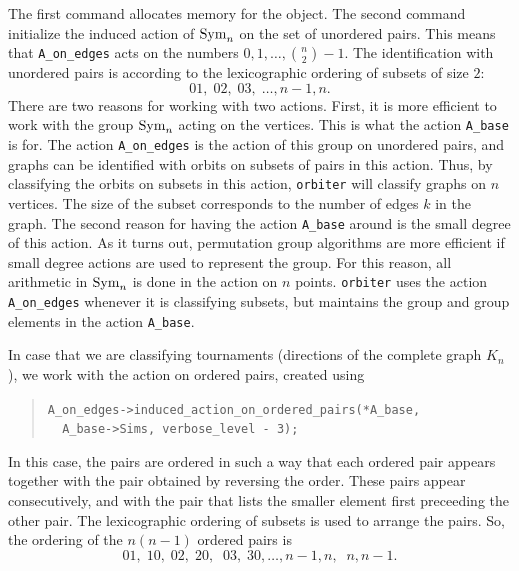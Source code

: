 The first command allocates memory for the object.
The second command initialize the induced action of ${\rm Sym}_n$ 
on the set of unordered pairs. This means that \verb'A_on_edges' acts on 
the numbers $0,1,\ldots,{n\choose 2}-1.$
The identification with unordered pairs is according to the lexicographic ordering of 
subsets of size $2$:
$$
01, \; 02, \;03, \; \ldots, n-1,n. 
$$
There are two reasons for working with two actions. 
First, it is more efficient to work with the group 
${\rm Sym}_n$ acting on the vertices. This is what the action 
\verb'A_base' is for. 
The action \verb'A_on_edges' is the action of this group 
on unordered pairs, and graphs can be identified with orbits 
on subsets of pairs in this action. 
Thus, by classifying the orbits on subsets in this action, 
\verb'orbiter' will classify graphs on $n$ vertices. 
The size of the subset corresponds to the number of edges $k$ 
in the graph. 
The second reason for having the action \verb'A_base' 
around is the small degree of this action. 
As it turns out, permutation group algorithms are more efficient 
if small degree actions are used to represent the group.
For this reason, all arithmetic in ${\rm Sym}_n$ is done in the 
action on $n$ points. \verb'orbiter' uses the action \verb'A_on_edges' whenever it is classifying subsets,  
but maintains the group and group elements in the action \verb'A_base'. 

\bigskip

In case that we are classifying tournaments (directions of the 
complete graph $K_n$), we work with the action on ordered pairs, 
created using 
\begin{quote}
\verb'A_on_edges->induced_action_on_ordered_pairs(*A_base, '\\
\verb'  A_base->Sims, verbose_level - 3);'\\
\end{quote}
In this case, the pairs are ordered in such a way that 
each ordered pair appears together with the pair obtained 
by reversing the order. These pairs appear consecutively, 
and with the 
pair that lists the smaller element first preceeding the other pair. 
The lexicographic ordering of subsets is used to arrange the pairs.
So, the ordering of the $n(n-1)$ ordered pairs is
$$
01, \; 10, \; 02, \; 20, \; \;03, \; 30, \ldots, n-1,n, \;\; n,n-1. 
$$

